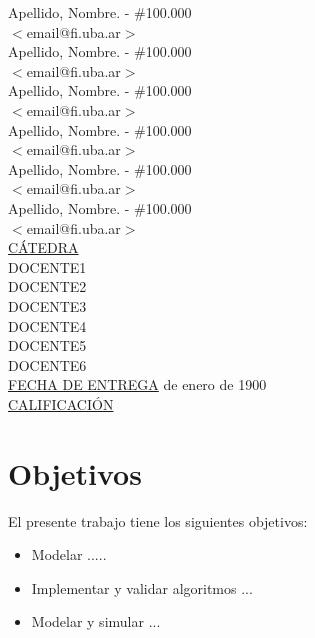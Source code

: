 \begin{titlepage}
\begin{tabbing}
		Apellido, Nombre.	\>\>- \#100.000\\
		\>\footnotesize{$<$email@fi.uba.ar$>$}\\
		Apellido, Nombre.	\>\>- \#100.000\\
		\>\footnotesize{$<$email@fi.uba.ar$>$}\\
		Apellido, Nombre.	\>\>- \#100.000\\
		\>\footnotesize{$<$email@fi.uba.ar$>$}\\
		Apellido, Nombre.	\>\>- \#100.000\\
		\>\footnotesize{$<$email@fi.uba.ar$>$}\\
		Apellido, Nombre.	\>\>- \#100.000\\
		\>\footnotesize{$<$email@fi.uba.ar$>$}\\
		Apellido, Nombre.	\>\>- \#100.000\\
		\>\footnotesize{$<$email@fi.uba.ar$>$}\\
		
		\<\underline{CÁTEDRA}\\[0.2cm]
		DOCENTE1 \\
		DOCENTE2 \\
		DOCENTE3 \\
		DOCENTE4 \\
		DOCENTE5 \\
		DOCENTE6 \\[0.2cm]
		
		\<\underline{FECHA DE ENTREGA}\>\> de enero de 1900
		\\[0.2cm]
		\<\underline{CALIFICACIÓN}\>\>\> 
		\\[0.2cm]
		
	\end{tabbing}
	
	
	
	
\end{titlepage}

\clearpage

\tableofcontents							

\clearpage

\clearpage
\section{Objetivos}
El presente trabajo tiene los siguientes objetivos:
\begin{itemize}
	\item Modelar .....
	\item Implementar y validar algoritmos ...
	\item Modelar y simular ...
\end{itemize}

